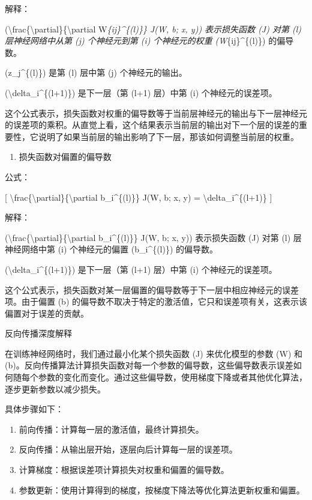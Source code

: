 解释：

(\textbackslash frac\{\textbackslash partial\}\{\textbackslash partial
W\emph{\{ij\}\^{}\{(l)\}\} J(W, b; x, y)) 表示损失函数 (J) 对第 (l)
层神经网络中从第 (j) 个神经元到第 (i) 个神经元的权重
(W}\{ij\}\^{}\{(l)\}) 的偏导数。

(z\_j\^{}\{(l)\}) 是第 (l) 层中第 (j) 个神经元的输出。

(\textbackslash delta\_i\^{}\{(l+1)\}) 是下一层（第 (l+1) 层）中第 (i)
个神经元的误差项。

这个公式表示，损失函数对权重的偏导数等于当前层神经元的输出与下一层神经元的误差项的乘积。从直觉上看，这个结果表示当前层的输出对下一个层的误差的重要性，它说明了如果当前层的输出影响了下一层，那该如何调整当前层的权重。

\begin{enumerate}
\def\labelenumi{\arabic{enumi}.}
\item
  损失函数对偏置的偏导数
\end{enumerate}

公式：

{[}
\textbackslash frac\{\textbackslash partial\}\{\textbackslash partial
b\_i\^{}\{(l)\}\} J(W, b; x, y) = \textbackslash delta\_i\^{}\{(l+1)\}
{]}


解释：

(\textbackslash frac\{\textbackslash partial\}\{\textbackslash partial
b\_i\^{}\{(l)\}\} J(W, b; x, y)) 表示损失函数 (J) 对第 (l)
层神经网络中第 (i) 个神经元的偏置 (b\_i\^{}\{(l)\}) 的偏导数。

(\textbackslash delta\_i\^{}\{(l+1)\}) 是下一层（第 (l+1) 层）中第 (i)
个神经元的误差项。

这个公式表示，损失函数对某一层偏置的偏导数等于下一层中相应神经元的误差项。由于偏置
(b)
的偏导数不取决于特定的激活值，它只和误差项有关，这表示该偏置对于误差的贡献。

反向传播深度解释

在训练神经网络时，我们通过最小化某个损失函数 (J) 来优化模型的参数 (W) 和
(b)。反向传播算法计算损失函数对每一个参数的偏导数，这些偏导数表示误差如何随每个参数的变化而变化。通过这些偏导数，使用梯度下降或者其他优化算法，逐步更新参数以减少损失。

具体步骤如下：

\begin{enumerate}
\def\labelenumi{\arabic{enumi}.}
\item
  前向传播：计算每一层的激活值，最终计算损失。
\item
  反向传播：从输出层开始，逐层向后计算每一层的误差项。
\item
  计算梯度：根据误差项计算损失对权重和偏置的偏导数。
\item
  参数更新：使用计算得到的梯度，按梯度下降法等优化算法更新权重和偏置。
\end{enumerate}

